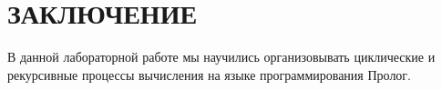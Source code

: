 \section*{ЗАКЛЮЧЕНИЕ}

В данной лабораторной работе мы научились организовывать 
циклические и рекурсивные процессы вычисления 
на языке программирования Пролог.

\newpage